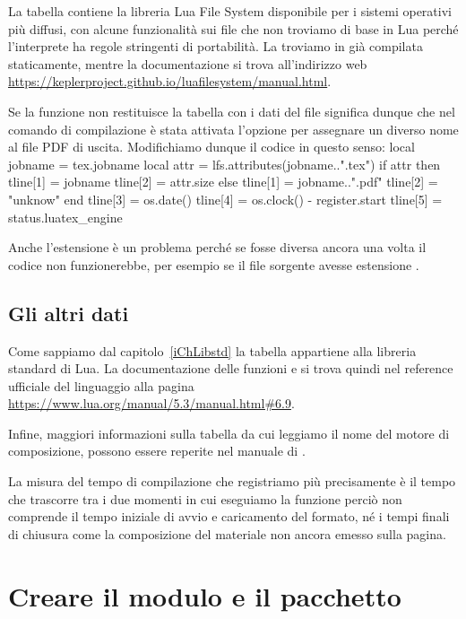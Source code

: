 La tabella  contiene la libreria Lua File System disponibile per i
sistemi operativi più diffusi, con alcune funzionalità sui file che non troviamo
di base in Lua perché l'interprete ha regole stringenti di portabilità. La
troviamo in \LuaTeX{} già compilata staticamente, mentre la documentazione
si trova all'indirizzo web
\url{https://keplerproject.github.io/luafilesystem/manual.html}.

Se la funzione  non restituisce la tabella con i dati del
file significa dunque che nel comando di compilazione è stata attivata l'opzione
 per assegnare un diverso nome al file PDF di uscita.
Modifichiamo dunque il codice in questo senso:
\lines
local jobname = tex.jobname
local attr = lfs.attributes(jobname..".tex")
if attr then
    tline[1] = jobname
    tline[2] = attr.size
else
    tline[1] = jobname..".pdf"
    tline[2] = "unknow"    
end
tline[3] = os.date()
tline[4] = os.clock() - register.start
tline[5] = status.luatex_engine
\endlines
{}

Anche l'estensione  è un problema perché se fosse diversa ancora una
volta il codice non funzionerebbe, per esempio se il file sorgente avesse
estensione .


\subsection{Gli altri dati}

Come sappiamo dal capitolo~\ref{iChLibstd} la tabella  appartiene alla
libreria standard di Lua. La documentazione delle funzioni  e
 si trova quindi nel reference ufficiale del linguaggio alla pagina
\url{https://www.lua.org/manual/5.3/manual.html#6.9}.

Infine, maggiori informazioni sulla tabella  da cui leggiamo il nome
del motore di composizione, possono essere reperite nel manuale di \LuaTeX{}.

La misura del tempo di compilazione che registriamo più precisamente è il tempo
che trascorre tra i due momenti in cui eseguiamo la funzione 
perciò non comprende il tempo iniziale di avvio e caricamento del formato, né
i tempi finali di chiusura come la composizione del materiale non ancora emesso
sulla pagina.


\section{Creare il modulo e il pacchetto}

